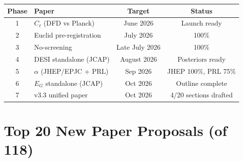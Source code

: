 \documentclass[11pt,a4paper]{article}
\begin{document}
\begin{center}
\begin{tabular}{clcc}
\toprule
\textbf{Phase} & \textbf{Paper} & \textbf{Target} & \textbf{Status} \\
\midrule
1 & $C_\ell$ (DFD vs Planck) & June 2026 & Launch ready \\
2 & Euclid pre-registration & July 2026 & 100\% \\
3 & No-screening & Late July 2026 & 100\% \\
4 & DESI standalone (JCAP) & August 2026 & Posteriors ready \\
5 & $\alpha$ (JHEP/EPJC + PRL) & Sep 2026 & JHEP 100\%, PRL 75\% \\
6 & $E_G$ standalone (JCAP) & Oct 2026 & Outline complete \\
7 & v3.3 unified paper & Oct 2026 & 4/20 sections drafted \\
\bottomrule
\end{tabular}
\end{center}


\section{Top 20 New Paper Proposals (of 118)}
\end{document}
